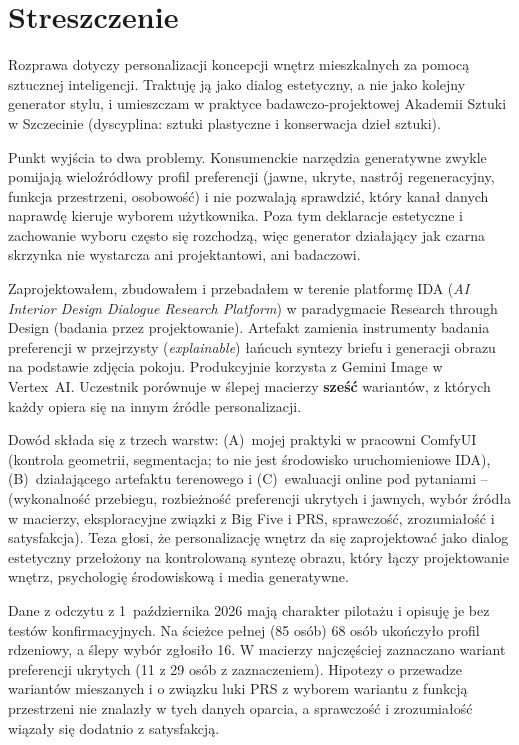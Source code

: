 \chapter*{Streszczenie}

Rozprawa dotyczy personalizacji koncepcji wnętrz mieszkalnych za pomocą sztucznej inteligencji. Traktuję ją jako dialog estetyczny, a nie jako kolejny generator stylu, i umieszczam w praktyce badawczo-projektowej Akademii Sztuki w Szczecinie (dyscyplina: sztuki plastyczne i konserwacja dzieł sztuki).

Punkt wyjścia to dwa problemy. Konsumenckie narzędzia generatywne zwykle pomijają wieloźródłowy profil preferencji (jawne, ukryte, nastrój regeneracyjny, funkcja przestrzeni, osobowość) i nie pozwalają sprawdzić, który kanał danych naprawdę kieruje wyborem użytkownika. Poza tym deklaracje estetyczne i zachowanie wyboru często się rozchodzą, więc generator działający jak czarna skrzynka nie wystarcza ani projektantowi, ani badaczowi.

Zaprojektowałem, zbudowałem i przebadałem w terenie platformę IDA (\emph{AI Interior Design Dialogue Research Platform}) w paradygmacie Research through Design (badania przez projektowanie). Artefakt zamienia instrumenty badania preferencji w przejrzysty (\emph{explainable}) łańcuch syntezy briefu i generacji obrazu na podstawie zdjęcia pokoju. Produkcyjnie korzysta z Gemini Image w Vertex~AI. Uczestnik porównuje w ślepej macierzy \textbf{sześć} wariantów, z których każdy opiera się na innym źródle personalizacji.

Dowód składa się z trzech warstw: (A)~mojej praktyki w pracowni ComfyUI (kontrola geometrii, segmentacja; to nie jest środowisko uruchomieniowe IDA), (B)~działającego artefaktu terenowego i (C)~ewaluacji online pod pytaniami -- (wykonalność przebiegu, rozbieżność preferencji ukrytych i jawnych, wybór źródła w macierzy, eksploracyjne związki z Big Five i PRS, sprawczość, zrozumiałość i satysfakcja). Teza głosi, że personalizację wnętrz da się zaprojektować jako dialog estetyczny przełożony na kontrolowaną syntezę obrazu, który łączy projektowanie wnętrz, psychologię środowiskową i media generatywne.

Dane z odczytu z 1~października 2026 mają charakter pilotażu i opisuję je bez testów konfirmacyjnych. Na ścieżce pełnej (85 osób) 68 osób ukończyło profil rdzeniowy, a ślepy wybór zgłosiło 16. W macierzy najczęściej zaznaczano wariant preferencji ukrytych (11 z 29 osób z zaznaczeniem). Hipotezy o przewadze wariantów mieszanych i o związku luki PRS z wyborem wariantu z funkcją przestrzeni nie znalazły w tych danych oparcia, a sprawczość i zrozumiałość wiązały się dodatnio z satysfakcją.

